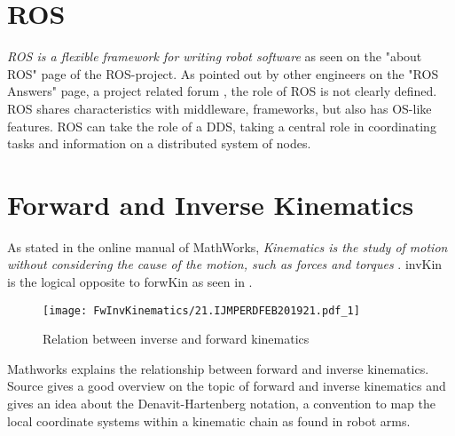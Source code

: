 
\section{ROS}
\textit{%
ROS is a flexible framework for writing robot software} as seen on the "about ROS" page of the ROS-project. As pointed out by other engineers on the "ROS Answers" page, a project related forum \cite{ROSAnswers_WhatIsRos}, the role of ROS is not clearly defined. ROS shares characteristics with middleware, frameworks, but also has \ac{OS}-like features. \ac{ROS} can take the role of a \ac{DDS}, taking a central role in coordinating tasks and information on a distributed system of nodes. %
\medskip

\section{Forward and Inverse Kinematics}

As stated in the online manual of MathWorks, \textit{Kinematics is the study of motion without considering the cause of the motion, such as forces and torques} \cite{MathWorksInverseKinematics}.
\Gls{invKin} is the logical opposite to \Gls{forwKin} as seen in . 


\begin{figure}[h]
	\texttt{[image: FwInvKinematics/21.IJMPERDFEB201921.pdf\_1]}
	\caption{Relation between inverse and forward kinematics \cite{SpaceStationManipulator}}
	\label{fig:FwVsInvKin}
\end{figure}







Mathworks \cite{forwardVsInverseKinematics} explains the relationship between forward and inverse kinematics.
Source \cite{allgInvKin} gives a good overview on the topic of forward and inverse kinematics and gives an idea about the Denavit-Hartenberg notation, a convention to map the local coordinate systems within a kinematic chain as found in robot arms.

